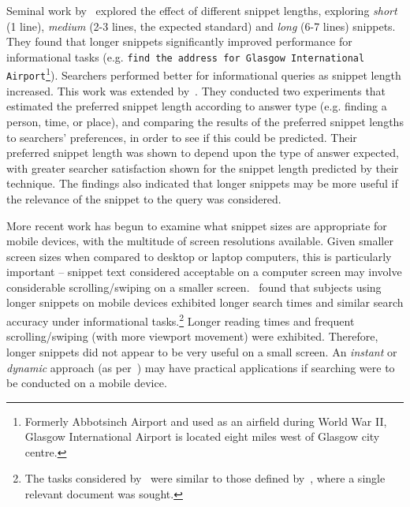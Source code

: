 Seminal work by~\cite{cutrell2007eye_tracking} explored the effect of different snippet lengths, exploring \emph{short} (1 line), \emph{medium} (2-3 lines, the expected standard) and \emph{long} (6-7 lines) snippets. They found that longer snippets significantly improved performance for informational tasks (e.g. \texttt{find the address for Glasgow International Airport}\footnote{Formerly Abbotsinch Airport and used as an airfield during World War II, Glasgow International Airport is located eight miles west of Glasgow city centre.}). Searchers performed better for informational queries as snippet length increased. This work was extended by~\cite{kaisser2008improving}. They conducted two experiments that estimated the preferred snippet length according to answer type (e.g. finding a person, time, or place), and comparing the results of the preferred snippet lengths to searchers' preferences, in order to see if this could be predicted. Their preferred snippet length was shown to depend upon the type of answer expected, with greater searcher satisfaction shown for the snippet length predicted by their technique. The findings also indicated that longer snippets may be more useful if the relevance of the snippet to the query was considered.

More recent work has begun to examine what snippet sizes are appropriate for mobile devices, with the multitude of screen resolutions available. Given smaller screen sizes when compared to desktop or laptop computers, this is particularly important -- snippet text considered acceptable on a computer screen may involve considerable scrolling/swiping on a smaller screen.~\cite{kim2017mobile_search_snippets} found that subjects using longer snippets on mobile devices exhibited longer search times and similar search accuracy under informational tasks.\footnote{The tasks considered by~\cite{kim2017mobile_search_snippets} were similar to those defined by~\cite{cutrell2007eye_tracking}, where a single relevant document was sought.} Longer reading times and frequent scrolling/swiping (with more viewport movement) were exhibited. Therefore, longer snippets did not appear to be very useful on a small screen. An \emph{instant} or \emph{dynamic} approach (as per~\cite{paek2004wavelens}) may have practical applications if searching were to be conducted on a mobile device.

